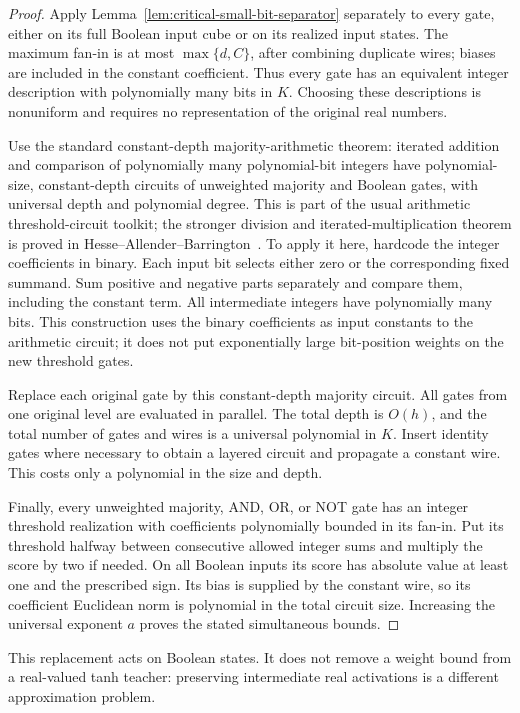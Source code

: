 \begin{proof}
Apply Lemma~\ref{lem:critical-small-bit-separator} separately to every
gate, either on its full Boolean input cube or on its realized input
states. The maximum fan-in is at most $\max\{d,C\}$, after combining
duplicate wires; biases are included in the constant coefficient.
Thus every gate has an equivalent integer description with
polynomially many bits in $K$. Choosing these descriptions is
nonuniform and requires no representation of the original real
numbers.

Use the standard constant-depth majority-arithmetic theorem: iterated
addition and comparison of polynomially many polynomial-bit integers
have polynomial-size, constant-depth circuits of unweighted majority
and Boolean gates, with universal depth and polynomial degree. This
is part of the usual arithmetic threshold-circuit toolkit; the
stronger division and iterated-multiplication theorem is proved in
Hesse--Allender--Barrington~\cite{hesse2002}. To apply it here, hardcode
the integer coefficients in binary. Each input bit selects either
zero or the corresponding fixed summand. Sum positive and negative
parts separately and compare them, including the constant term. All
intermediate integers have polynomially many bits. This construction
uses the binary coefficients as input constants to the arithmetic
circuit; it does not put exponentially large bit-position weights
on the new threshold gates.

Replace each original gate by this constant-depth majority circuit.
All gates from one original level are evaluated in parallel. The
total depth is $O(h)$, and the total number of gates and wires is a
universal polynomial in $K$. Insert identity gates where necessary
to obtain a layered circuit and propagate a constant wire. This
costs only a polynomial in the size and depth.

Finally, every unweighted majority, AND, OR, or NOT gate has an
integer threshold realization with coefficients polynomially bounded
in its fan-in. Put its threshold halfway between consecutive allowed
integer sums and multiply the score by two if needed. On all Boolean
inputs its score has absolute value at least one and the prescribed
sign. Its bias is supplied by the constant wire, so its coefficient
Euclidean norm is polynomial in the total circuit size. Increasing
the universal exponent $a$ proves the stated simultaneous bounds.
\end{proof}

This replacement acts on Boolean states. It does not remove a weight
bound from a real-valued tanh teacher: preserving intermediate real
activations is a different approximation problem.
